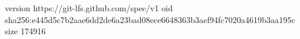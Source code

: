 version https://git-lfs.github.com/spec/v1
oid sha256:e445d5c7b2aae6dd2de6a23bad08ece6648363b3aef94fc7020a4619b3aa195c
size 174916
